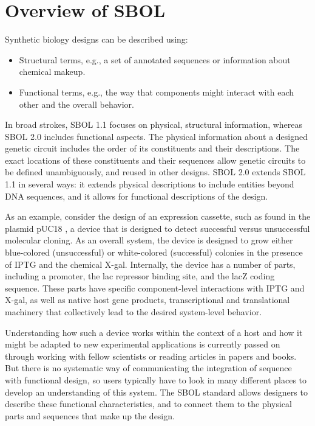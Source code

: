 \section{Overview of SBOL}


Synthetic biology designs can be described using:
\begin{itemize}
\item Structural terms, e.g., a set of annotated sequences or information about chemical makeup.
\item Functional terms, e.g., the way that components might interact with each other and the overall behavior.
\end{itemize}
In broad strokes, SBOL 1.1 focuses on physical, structural information, whereas SBOL 2.0 includes functional aspects. The physical information about a designed genetic circuit includes the order of its constituents and their descriptions. The exact locations of these constituents and their sequences allow genetic circuits to be defined unambiguously, and reused in other designs. SBOL 2.0 extends SBOL 1.1 in several ways: it extends physical descriptions to include entities beyond DNA sequences, and it allows for functional descriptions of the design. 

As an example, consider the design of an expression cassette, such as found in the plasmid pUC18 \cite{L08752.1}, a device that is designed to detect successful versus unsuccessful molecular cloning. As an overall system, the device is designed to grow either blue-colored (unsuccessful) or white-colored (successful) colonies in the presence of IPTG and the chemical X-gal. Internally, the device has a number of parts, including a promoter, the lac repressor binding site, and the lacZ coding sequence. These parts have specific component-level interactions with IPTG and X-gal, as well as native host gene products, transcriptional and translational machinery that collectively lead to the desired system-level behavior. 

Understanding how such a device works within the context of a host and how it might be adapted to new experimental applications is currently passed on through working with fellow scientists or reading articles in papers and books. But there is no systematic way of communicating the integration of sequence with functional design, so users typically have to look in many different places to develop an understanding of this system.  
The SBOL standard allows designers to describe these functional characteristics, and to connect them to the physical parts and sequences that make up the design. 

